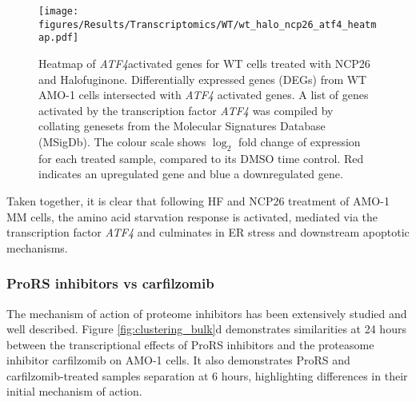 \begin{figure}[hptb]
\centering
\texttt{[image: figures/Results/Transcriptomics/WT/wt\_halo\_ncp26\_atf4\_heatmap.pdf]}
\caption[Heatmap of \textit{ATF4} activated genes for ProRS treated WT cells]{Heatmap of \textit{ATF4}activated genes for WT cells treated with NCP26 and Halofuginone.
Differentially expressed genes (DEGs) from WT AMO-1 cells intersected with \textit{ATF4} activated genes.
A list of genes activated by the transcription factor \textit{ATF4} was compiled by collating genesets from the Molecular Signatures Database (MSigDb).
The colour scale shows $\log_{2}$ fold change of expression for each treated sample, compared to its DMSO time control.
Red indicates an upregulated gene and blue a downregulated gene.
}
\label{fig:wt_atf4_heatmap}
\end{figure}

Taken together, it is clear that following HF and NCP26 treatment of AMO-1 MM cells, the amino acid starvation response is activated, mediated via the transcription factor \textit{ATF4} and culminates in ER stress and downstream apoptotic mechanisms.

\subsubsection{ProRS inhibitors vs carfilzomib}
The mechanism of action of proteome inhibitors has been extensively studied and well described.
Figure \ref{fig:clustering_bulk}d demonstrates similarities at 24 hours between the transcriptional effects of ProRS inhibitors and the proteasome inhibitor carfilzomib on AMO-1 cells.
It also demonstrates ProRS and carfilzomib-treated samples separation at 6 hours, highlighting differences in their initial mechanism of action.

